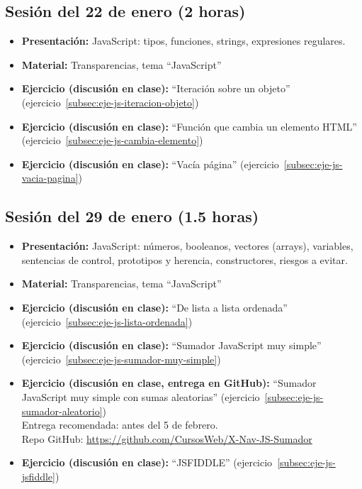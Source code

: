 \documentclass[a4paper,12pt]{report}
\begin{document}
\subsection{Sesión del 22 de enero (2 horas)}

\begin{itemize}
\item \textbf{Presentación:} JavaScript: tipos,  funciones, strings, expresiones regulares.
\item \textbf{Material:} Transparencias, tema ``JavaScript''
\item \textbf{Ejercicio (discusión en clase):} ``Iteración sobre un objeto'' (ejercicio~\ref{subsec:eje-js-iteracion-objeto})
\item \textbf{Ejercicio (discusión en clase):} ``Función que cambia un elemento HTML'' (ejercicio~\ref{subsec:eje-js-cambia-elemento})
\item \textbf{Ejercicio (discusión en clase):} ``Vacía página'' (ejercicio~\ref{subsec:eje-js-vacia-pagina})
\end{itemize}


\subsection{Sesión del 29 de enero (1.5 horas)}

\begin{itemize}
\item \textbf{Presentación:} JavaScript: números, booleanos, vectores (arrays), variables, sentencias de control, prototipos y herencia, constructores, riesgos a evitar.
\item \textbf{Material:} Transparencias, tema ``JavaScript''
\item \textbf{Ejercicio (discusión en clase):} ``De lista a lista ordenada'' (ejercicio~\ref{subsec:eje-js-lista-ordenada})
\item \textbf{Ejercicio (discusión en clase):} ``Sumador JavaScript muy simple'' (ejercicio~\ref{subsec:eje-js-sumador-muy-simple})
\item \textbf{Ejercicio (discusión en clase, entrega en GitHub):} ``Sumador JavaScript muy simple con sumas aleatorias'' (ejercicio~\ref{subsec:eje-js-sumador-aleatorio}) \\
  Entrega recomendada: antes del 5 de febrero. \\
  Repo GitHub: \url{https://github.com/CursosWeb/X-Nav-JS-Sumador}
\item \textbf{Ejercicio (discusión en clase):} ``JSFIDDLE'' (ejercicio~\ref{subsec:eje-js-jsfiddle})
\end{itemize}
\end{document}
